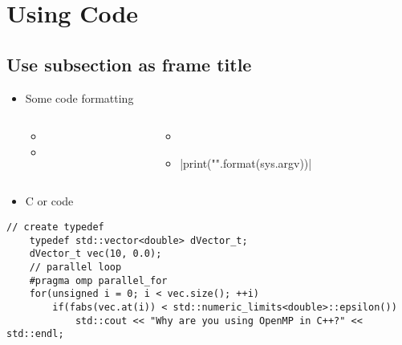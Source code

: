 \documentclass[xcolor=dvipsnames,compress,10pt]{nersc}
\begin{document}
%
\section{Using Code}

%
\subsection{Use subsection as frame title}
\begin{frame}[fragile]
    \begin{itemize}
        \item Some code formatting
        \begin{columns}[T]
            \begin{column}[T]{0.2\textwidth}
                \begin{itemize}
                    \setlength\itemsep{0.5em}
                    \item {}
                    \item {}
                \end{itemize}
            \end{column}
            \begin{column}[T]{0.65\textwidth}
                \begin{itemize}
                    \setlength\itemsep{0.5em}
                    \item {}
                    \item \lstinlinepy|print("{}".format(sys.argv))|
                \end{itemize}
            \end{column}
        \end{columns}
    \end{itemize}
\vfill

\begin{itemize}
    \item C or \CPP code
\end{itemize}

\vfill

\begin{lstlisting}[style=customc]
    // create typedef
    typedef std::vector<double> dVector_t;
    dVector_t vec(10, 0.0);
    // parallel loop
    #pragma omp parallel_for
    for(unsigned i = 0; i < vec.size(); ++i)
        if(fabs(vec.at(i)) < std::numeric_limits<double>::epsilon())
            std::cout << "Why are you using OpenMP in C++?" << std::endl;
\end{lstlisting}


\end{frame}
\end{document}
